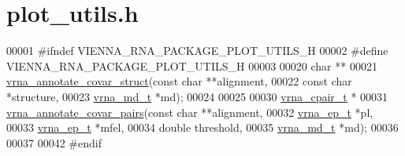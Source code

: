 \hypertarget{plot__utils_8h_source}{}\section{plot\+\_\+utils.\+h}
\label{plot__utils_8h_source}

\begin{DoxyCode}
00001 \textcolor{preprocessor}{#ifndef VIENNA\_RNA\_PACKAGE\_PLOT\_UTILS\_H}
00002 \textcolor{preprocessor}{#define VIENNA\_RNA\_PACKAGE\_PLOT\_UTILS\_H}
00003 
00020 \textcolor{keywordtype}{char} **
00021 \hyperlink{group__annotation__utils_gae0305bbf95eddd4a57648a1e4739a7f3}{vrna\_annotate\_covar\_struct}(\textcolor{keyword}{const} \textcolor{keywordtype}{char} **alignment,
00022                            \textcolor{keyword}{const} \textcolor{keywordtype}{char} *structure,
00023                            \hyperlink{group__model__details_structvrna__md__s}{vrna\_md\_t}  *md);
00024 
00025 
00030 \hyperlink{group__data__structures_structvrna__cpair__s}{vrna\_cpair\_t} *
00031 \hyperlink{group__annotation__utils_gadb9ba32197f05d5876d389b2ba92edac}{vrna\_annotate\_covar\_pairs}(\textcolor{keyword}{const} \textcolor{keywordtype}{char}  **alignment,
00032                           \hyperlink{group__struct__utils_structvrna__elem__prob__s}{vrna\_ep\_t}   *pl,
00033                           \hyperlink{group__struct__utils_structvrna__elem__prob__s}{vrna\_ep\_t}   *mfel,
00034                           \textcolor{keywordtype}{double}      threshold,
00035                           \hyperlink{group__model__details_structvrna__md__s}{vrna\_md\_t}   *md);
00036 
00037 
00042 \textcolor{preprocessor}{#endif}
\end{DoxyCode}

